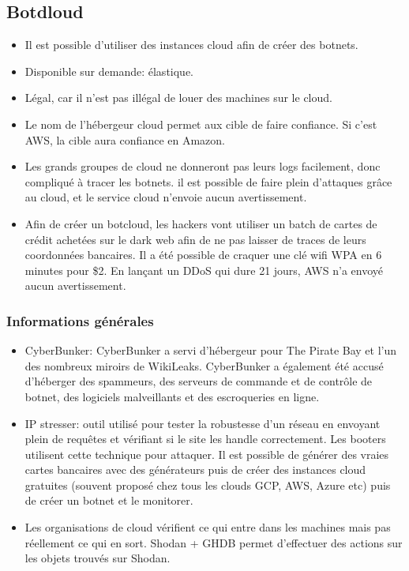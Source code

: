 \documentclass[12pt, oneside]{article}
\begin{document}
\subsection{Botdloud}
\begin{itemize}
\item Il est possible d'utiliser des instances cloud afin de créer des botnets.
\item Disponible sur demande: élastique.
\item Légal, car il n'est pas illégal de louer des machines sur le cloud.
\item Le nom de l'hébergeur cloud permet aux cible de faire confiance. Si c'est AWS, la cible aura confiance en Amazon.
\item Les grands groupes de cloud ne donneront pas leurs logs facilement, donc compliqué à tracer les botnets.
il est possible de faire plein d'attaques grâce au cloud, et le service cloud n'envoie aucun avertissement.
\item Afin de créer un botcloud, les hackers vont utiliser un batch de cartes de crédit achetées sur le dark web afin de ne pas laisser de traces de leurs coordonnées bancaires. Il a été possible de craquer une clé wifi WPA en 6 minutes pour \$2. En lançant un DDoS qui dure 21 jours, AWS n'a envoyé aucun avertissement.
\end{itemize}

\subsubsection{Informations générales}
\begin{itemize}
\item CyberBunker: CyberBunker a servi d'hébergeur pour The Pirate Bay et l'un des nombreux miroirs de WikiLeaks. CyberBunker a également été accusé d'héberger des spammeurs, des serveurs de commande et de contrôle de botnet, des logiciels malveillants et des escroqueries en ligne.

\item IP stresser: outil utilisé pour tester la robustesse d'un réseau en envoyant plein de requêtes et vérifiant si le site les handle correctement. Les booters utilisent cette technique pour attaquer. Il est possible de générer des vraies cartes bancaires avec des générateurs puis de créer des instances cloud gratuites (souvent proposé chez tous les clouds GCP, AWS, Azure etc) puis de créer un botnet et le monitorer.
\item Les organisations de cloud vérifient ce qui entre dans les machines mais pas réellement ce qui en sort. Shodan + GHDB permet d'effectuer des actions sur les objets trouvés sur Shodan.
\end{itemize}
\end{document}
